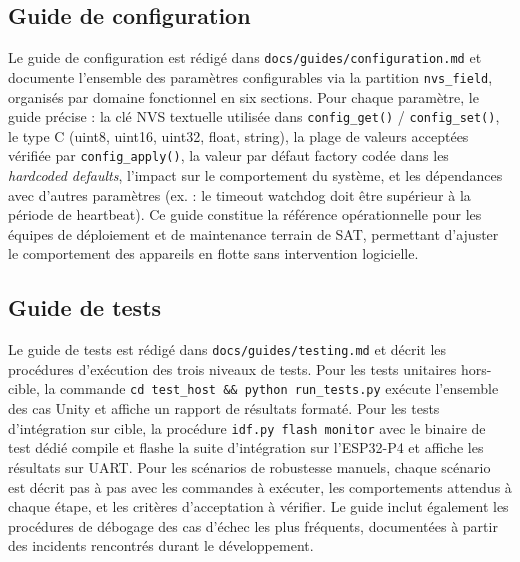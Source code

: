 \subsection{Guide de configuration}
\label{subsec:doc_cfg}

Le guide de configuration est rédigé dans
\texttt{docs/guides/configuration.md} et documente l'ensemble des
paramètres configurables via la partition \texttt{nvs\_field}, organisés
par domaine fonctionnel en six sections. Pour chaque paramètre, le
guide précise : la clé NVS textuelle utilisée dans \texttt{config\_get()}
/ \texttt{config\_set()}, le type C (uint8, uint16, uint32, float,
string), la plage de valeurs acceptées vérifiée par
\texttt{config\_apply()}, la valeur par défaut factory codée dans les
\textit{hardcoded defaults}, l'impact sur le comportement du système,
et les dépendances avec d'autres paramètres (ex. : le timeout watchdog
doit être supérieur à la période de heartbeat). Ce guide constitue la
référence opérationnelle pour les équipes de déploiement et de maintenance
terrain de SAT, permettant d'ajuster le comportement des appareils en
flotte sans intervention logicielle.

\subsection{Guide de tests}
\label{subsec:doc_tests}

Le guide de tests est rédigé dans \texttt{docs/guides/testing.md}
et décrit les procédures d'exécution des trois niveaux de tests.
Pour les tests unitaires hors-cible, la commande
\texttt{cd test\_host \&\& python run\_tests.py} exécute l'ensemble
des cas Unity et affiche un rapport de résultats formaté. Pour les
tests d'intégration sur cible, la procédure \texttt{idf.py flash
monitor} avec le binaire de test dédié compile et flashe la suite
d'intégration sur l'ESP32-P4 et affiche les résultats sur UART.
Pour les scénarios de robustesse manuels, chaque scénario est décrit
pas à pas avec les commandes à exécuter, les comportements attendus
à chaque étape, et les critères d'acceptation à vérifier. Le guide
inclut également les procédures de débogage des cas d'échec les plus
fréquents, documentées à partir des incidents rencontrés durant le
développement.

